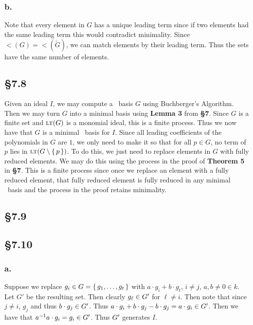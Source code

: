 \documentclass[letterpaper]{article}
\begin{document}
\subsubsection*{b.}

Note that every element in $G$ has a unique leading term since if two elements had the same leading term this would contradict minimality.
Since $\lt(G) = \lt(\tilde{G})$, we can match elements by their leading term.
Thus the sets have the same number of elements.

\subsection*{\S 7.8}

Given an ideal $I$, we may compute a \Grobner\ basis $G$ using Buchberger's Algorithm.
Then we may turn $G$ into a minimal basis using \textbf{Lemma 3} from \textbf{\S 7}.
Since $G$ is a finite set and $\gen{\lt(G)}$ is a monomial ideal, this is a finite process.
Thus we now have that $G$ is a minimal \Grobner\ basis for $I$.
Since all leading coefficients of the polynomials in $G$ are $1$, we only need to make it so that for all $p \in G$, no term of $p$ lies in $\gen{\lt(G \setminus \set{p})}$.
To do this, we just need to replace elements in $G$ with fully reduced elements.
We may do this using the process in the proof of \textbf{Theorem 5} in \textbf{\S 7}.
This is a finite process since once we replace an element with a fully reduced element, that fully reduced element is fully reduced in any minimal \Grobner\ basis and the process in the proof retains minimality.

\subsection*{\S 7.9}


\subsection*{\S 7.10}

\subsubsection*{a.}

Suppose we replace $g_{i} \in G = \set{g_{1}, \ldots, g_{t}}$ with $a \cdot g_{i} + b \cdot g_{t}$, $i \neq j$, $a,b \neq 0 \in k$.
Let $G'$ be the resulting set.
Then clearly $g_{\ell} \in \gen{G'}$ for $\ell \neq i$.
Then note that since $j \neq i$, $g_{j}$ and thus $b \cdot g_{j} \in \gen{G'}$.
Thus $a \cdot g_{i} + b \cdot g_{j} - b \cdot g_{j} = a \cdot g_{i} \in \gen{G'}$.
Then we have that $a^{-1} a \cdot g_{i} = g_{i} \in \gen{G'}$.
Thus $\gen{G'}$ generates $I$.
\end{document}
